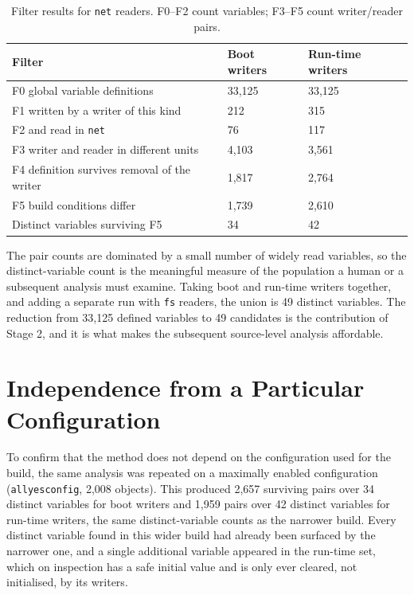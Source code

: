 \documentclass[12pt, a4paper, oneside]{book}
\begin{document}
\begin{table}[H]
\centering
\caption{Filter results for \texttt{net} readers. F0--F2 count variables;
F3--F5 count writer/reader pairs.}
\label{tab:funnel}
\renewcommand{\arraystretch}{1.4}
\begin{tabularx}{\textwidth}{L{7.4cm} C{2.6cm} C{2.6cm}}
\toprule
\textbf{Filter} & \textbf{Boot writers} & \textbf{Run-time writers} \\
\midrule
F0 global variable definitions      & 33,125 & 33,125 \\
F1 written by a writer of this kind &    212 &    315 \\
F2 and read in \texttt{net}         &     76 &    117 \\
F3 writer and reader in different units & 4,103 & 3,561 \\
F4 definition survives removal of the writer & 1,817 & 2,764 \\
F5 build conditions differ          &  1,739 &  2,610 \\
\midrule
Distinct variables surviving F5     &     34 &     42 \\
\bottomrule
\end{tabularx}
\end{table}

The pair counts are dominated by a small number of widely read variables, so the
distinct-variable count is the meaningful measure of the population a human or a
subsequent analysis must examine. Taking boot and run-time writers together, and
adding a separate run with \texttt{fs} readers, the union is 49 distinct
variables. The reduction from 33,125 defined variables to 49 candidates is the
contribution of Stage 2, and it is what makes the subsequent source-level
analysis affordable.

\section{Independence from a Particular Configuration}

To confirm that the method does not depend on the configuration used for the
build, the same analysis was repeated on a maximally enabled configuration
(\texttt{allyesconfig}, 2,008 objects). This produced 2,657 surviving pairs over
34 distinct variables for boot writers and 1,959 pairs over 42 distinct variables
for run-time writers, the same distinct-variable counts as the narrower build.
Every distinct variable found in this wider build had already been surfaced by
the narrower one, and a single additional variable appeared in the run-time set,
which on inspection has a safe initial value and is only ever cleared, not
initialised, by its writers.
\end{document}
